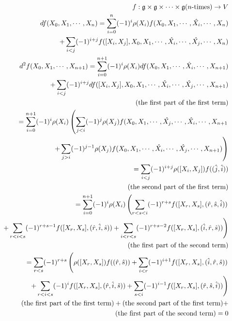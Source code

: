 \documentclass{article}
\newcommand{\lie}[1]{\mathfrak{#1}}
\begin{document}
\begin{eqnarray*}
  f : \lie{g} \times \lie{g} \times \cdots \times \lie{g} (\textrm{$n$-times}) \to V \\
  df(X_0, X_1, \cdots, X_n) = \sum_{i = 0}^n (-1)^i \rho(X_i) f(X_0, X_1, \cdots, \hat{X_i}, \cdots, X_n) \\ 
    + \sum_{i < j} (-1)^{i + j} f([X_i, X_j], X_0, X_1, \cdots, \hat{X_i}, \cdots, \hat{X_j}, \cdots, X_n) \\
  d^2 f(X_0, X_1, \cdots, X_{n + 1}) = \sum_{i = 0}^{n + 1} (-1)^i \rho(X_i) df(X_0, X_1, \cdots, \hat{X_i}, \cdots, X_{n + 1}) \\ 
    + \sum_{i < j} (-1)^{i + j} df([X_i, X_j], X_0, X_1, \cdots, \hat{X_i}, \cdots, \hat{X_j}, \cdots, X_{n + 1}) \\
  (\textrm{the first part of the first term}) \\
  = \sum_{i = 0}^{n + 1} (-1)^i \rho(X_i) \left( \sum_{j < i} (-1)^j \rho(X_j) f(X_0, X_1, \cdots, \hat{X_j}, \cdots, \hat{X_i}, \cdots, X_{n + 1} \right. \\ 
    \left. + \sum_{j > i} (-1)^{j - 1} \rho(X_j) f(X_0, X_1, \cdots, \hat{X_i}, \cdots, \hat{X_j}, \cdots, X_{n + 1}) \right) \\ 
    = \sum_{i < j} (-1)^{i + j} \rho([X_i, X_j]) f((\hat{j}, \hat{i})) \\
  (\textrm{the second part of the first term}) \\
  = \sum_{i = 0}^{n + 1} (-1)^i \rho(X_i) \left( \sum_{r < s < i} (-1)^{r + s} f([X_r, X_s], (\hat{r}, \hat{s}, \hat{i})) \right. \\
    \left. + \sum_{r < i < s} (-1)^{r + s - 1} f([X_r, X_s], (\hat{r}, \hat{i}, \hat{s})) + \sum_{i < r < s} (-1)^{r + s - 2} f([X_r, X_s], (\hat{i}, \hat{r}, \hat{s})) \right) \\
  (\textrm{the first part of the second term}) \\
  = \sum_{r < s} (-1)^{r + s} \left( \vphantom{\sum} \rho([X_r, X_s]) f((\hat{r}, \hat{s})) + \sum_{i < r} (-1)^{i + 1} f([X_r, X_s], (\hat{i}, \hat{r}, \hat{s})) \right. \\
    \left. + \sum_{r < i < s} (-1)^{i} f([X_r, X_s], (\hat{r}, \hat{i}, \hat{s})) + \sum_{s < i} (-1)^{i - 1} f([X_r, X_s], (\hat{r}, \hat{s}, \hat{i})) \right) \\
  (\textrm{the first part of the first term}) + (\textrm{the second part of the first term}) + \\ 
  (\textrm{the first part of the second term}) = 0
\end{eqnarray*}
\end{document}
